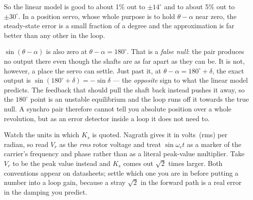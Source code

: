 \documentclass[11pt,a4paper]{article}
\begin{document}
So the linear model is good to about 1\% out to $\pm14^\circ$ and to about 5\%
out to $\pm30^\circ$. In a position servo, whose whole purpose is to hold
$\theta-\alpha$ near zero, the steady-state error is a small fraction of a
degree and the approximation is far better than any other in the loop.

\begin{pitfall}
$\sin(\theta-\alpha)$ is also zero at $\theta-\alpha=180^\circ$. That is a
\emph{false null}: the pair produces no output there even though the shafts
are as far apart as they can be. It is not, however, a place the servo can
settle. Just past it, at $\theta-\alpha=180^\circ+\delta$, the exact output is
$\sin(180^\circ+\delta)=-\sin\delta$ --- the \emph{opposite} sign to what the
linear model predicts. The feedback that should pull the shaft back instead
pushes it away, so the $180^\circ$ point is an unstable equilibrium and the
loop runs off it towards the true null. A synchro pair therefore cannot tell
you absolute position over a whole revolution, but as an error detector inside
a loop it does not need to.
\end{pitfall}

\begin{pitfall}
Watch the units in which $K_{s}$ is quoted. Nagrath gives it in
volts~(rms) per radian, so read $V_{r}$ as the \emph{rms} rotor voltage and
treat $\sin\omega_{c}t$ as a marker of the carrier's frequency and phase
rather than as a literal peak-value multiplier. Take $V_{r}$ to be the peak
value instead and $K_{s}$ comes out $\sqrt{2}$ times larger. Both conventions
appear on datasheets; settle which one you are in before putting a number into
a loop gain, because a stray $\sqrt{2}$ in the forward path is a real error in
the damping you predict.
\end{pitfall}
\end{document}
